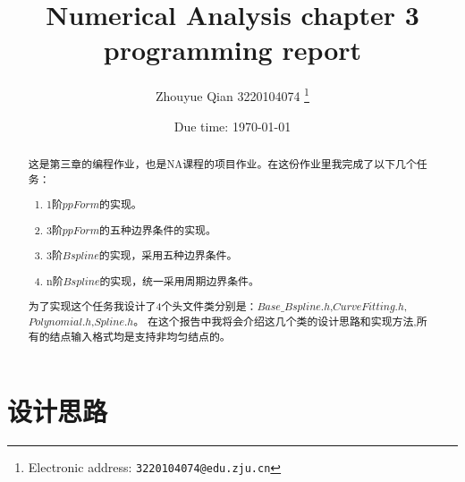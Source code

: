 \documentclass[a4paper]{article}
\begin{document}
\title{Numerical Analysis chapter 3 programming report}

\author{Zhouyue Qian 3220104074
  \thanks{Electronic address: \texttt{3220104074@edu.zju.cn}}}
  


\date{Due time: \today}

\maketitle

\begin{abstract}
  这是第三章的编程作业，也是NA课程的项目作业。在这份作业里我完成了以下几个任务：
  \begin{enumerate}
    \item 1阶$ppForm$的实现。
    \item 3阶$ppForm$的五种边界条件的实现。
    \item 3阶$Bspline$的实现，采用五种边界条件。
    \item n阶$Bspline$的实现，统一采用周期边界条件。
  \end{enumerate}
  为了实现这个任务我设计了4个头文件类分别是：$Base\_Bspline.h$,$CurveFitting.h$,$Polynomial.h$,$Spline.h$。
  在这个报告中我将会介绍这几个类的设计思路和实现方法,所有的结点输入格式均是支持非均匀结点的。
\end{abstract}

\section*{\textbf{设计思路}}
\end{document}
